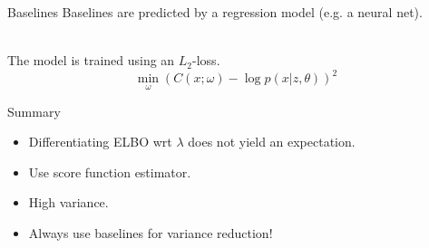 \documentclass[14pt]{beamer}
\begin{document}
\begin{frame}{Baselines}
Baselines are predicted by a regression model (e.g. a neural net). \\

~

The model is trained using 
an $ L_{2} $-loss.
\begin{equation*}
\min_\omega \left(C(x; \omega) - \log p(x|z,\theta)\right)^{2}
\end{equation*}
\end{frame}

\begin{frame}{Summary}
\begin{itemize}
\pause
\item Differentiating ELBO wrt $ \lambda $ does not yield an expectation.
\pause
\item Use score function estimator.
\pause
\item High variance.
\pause
\item Always use baselines for variance reduction!
\end{itemize}
\end{frame}
\end{document}
